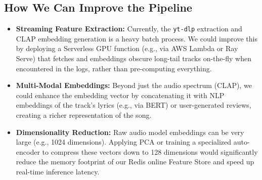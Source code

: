 \documentclass[12pt, letterpaper]{article}
\begin{document}
\subsection{How We Can Improve the Pipeline}
\begin{itemize}
    \item \textbf{Streaming Feature Extraction:} Currently, the \texttt{yt-dlp} extraction and CLAP embedding generation is a heavy batch process. We could improve this by deploying a Serverless GPU function (e.g., via AWS Lambda or Ray Serve) that fetches and embeddings obscure long-tail tracks on-the-fly when encountered in the logs, rather than pre-computing everything.
    \item \textbf{Multi-Modal Embeddings:} Beyond just the audio spectrum (CLAP), we could enhance the embedding vector by concatenating it with NLP embeddings of the track's lyrics (e.g., via BERT) or user-generated reviews, creating a richer representation of the song.
    \item \textbf{Dimensionality Reduction:} Raw audio model embeddings can be very large (e.g., 1024 dimensions). Applying PCA or training a specialized auto-encoder to compress these vectors down to 128 dimensions would significantly reduce the memory footprint of our Redis online Feature Store and speed up real-time inference latency.
\end{itemize}
\end{document}
